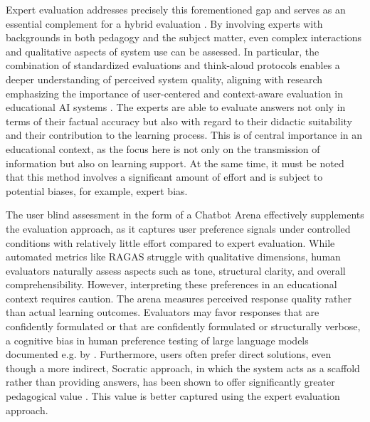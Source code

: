 Expert evaluation addresses precisely this forementioned gap and serves as an essential complement for a hybrid evaluation \autocite{bdcc9120320, 202504.0369}. By involving experts with backgrounds in both pedagogy and the subject matter, even complex interactions and qualitative aspects of system use can be assessed. In particular, the combination of standardized evaluations and think-aloud protocols enables a deeper understanding of perceived system quality, aligning with research emphasizing the importance of user-centered and context-aware evaluation in educational AI systems \autocite{ZawackiRichter2019}. The experts are able to evaluate answers not only in terms of their factual accuracy but also with regard to their didactic suitability and their contribution to the learning process. This is of central importance in an educational context, as the focus here is not only on the transmission of information but also on learning support. At the same time, it must be noted that this method involves a significant amount of effort and is subject to potential biases, for example, expert bias.

The user blind assessment in the form of a Chatbot Arena effectively supplements the evaluation approach, as it captures user preference signals under controlled conditions with relatively little effort compared to expert evaluation.
While automated metrics like RAGAS struggle with qualitative dimensions, human evaluators naturally assess aspects such as tone, structural clarity, and overall comprehensibility.
However, interpreting these preferences in an educational context requires caution.
The arena measures perceived response quality rather than actual learning outcomes.
Evaluators may favor responses that are confidently formulated or that are confidently formulated or structurally verbose, a cognitive bias in human preference testing of large language models documented e.g. by \autocite{Zheng2023LMSYSArena}.
Furthermore, users often prefer direct solutions, even though a more indirect, Socratic approach, in which the system acts as a scaffold rather than providing answers, has been shown to offer significantly greater pedagogical value \autocite{KASNECI2023102274}.
This value is better captured using the expert evaluation approach.

